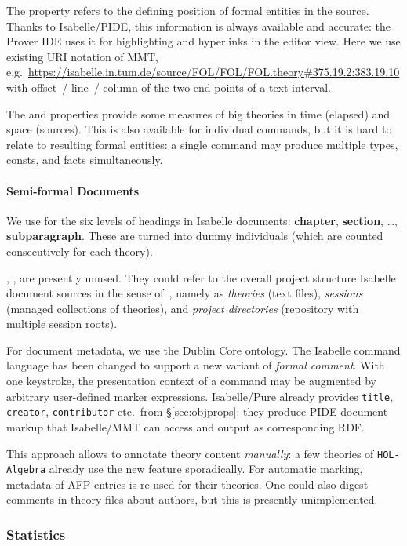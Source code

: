 The  property refers to the defining position of formal entities in the source.
Thanks to Isabelle/PIDE, this information is always available and accurate: the Prover IDE uses it for highlighting and hyperlinks in the editor view. Here we use existing URI notation of MMT, e.g.\ \url{https://isabelle.in.tum.de/source/FOL/FOL/FOL.theory#375.19.2:383.19.10} with offset~/ line~/ column of the two end-points of a text interval.

The  and  properties provide some measures of big theories in time (elapsed) and space (sources).  This is also available for individual commands, but it is hard to relate to resulting formal entities: a single command may produce multiple types, consts, and facts simultaneously.

\paragraph{Semi-formal Documents}
We use  for the six levels of headings in Isabelle documents: \textbf{chapter}, \textbf{section}, \dots, \textbf{subparagraph}.  These are turned into dummy individuals (which are counted consecutively for each theory).

, ,  are presently unused.
They could refer to the overall project structure Isabelle document sources in the sense of~\cite{Wenzel:IIdsflitd18}, namely as \emph{theories} (text files), \emph{sessions} (managed collections of theories), and \emph{project directories} (repository with multiple session roots).

For document metadata, we use the Dublin Core ontology.  The Isabelle command language has been changed to support a new variant of \emph{formal comment}. With one keystroke, the presentation context of a command may be augmented by arbitrary user-defined marker expressions. Isabelle/Pure already provides \texttt{title}, \texttt{creator}, \texttt{contributor} etc.\ from \S\ref{sec:objprops}: they produce PIDE document markup that Isabelle/MMT can access and output as corresponding RDF.

This approach allows to annotate theory content \emph{manually}: a few theories of \texttt{HOL-Algebra} already use the new feature sporadically. For automatic marking, metadata of AFP entries is re-used for their theories. One could also digest comments in theory files about authors, but this is presently unimplemented.


\subsubsection{Statistics}\label{sec:stats}


